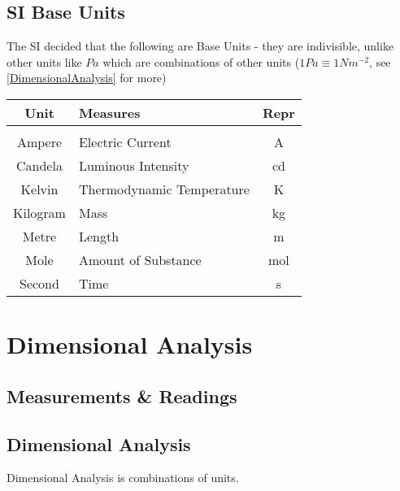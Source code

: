 \section{SI Base Units}
The SI decided that the following are Base Units - they are indivisible, unlike other units like \(Pa\) which are combinations of other units (\(1 Pa \equiv 1 Nm^{-2}\), see \eqref{DimensionalAnalysis} for more) \\

\begin{tabular}{clc}
	Unit     & Measures                  & Repr  \\
	\hline & \\
	Ampere   & Electric Current          & A     \\
	Candela  & Luminous Intensity        & cd    \\
	Kelvin   & Thermodynamic Temperature & K     \\
	Kilogram & Mass                      & kg    \\
	Metre    & Length                    & m     \\
	Mole     & Amount of Substance       & mol   \\
	Second   & Time                      & s    
\end{tabular}


\chapter{Dimensional Analysis \label{DimensionalAnalysis}}

\section{Measurements \& Readings}

\section{Dimensional Analysis}

Dimensional Analysis is combinations of units.

